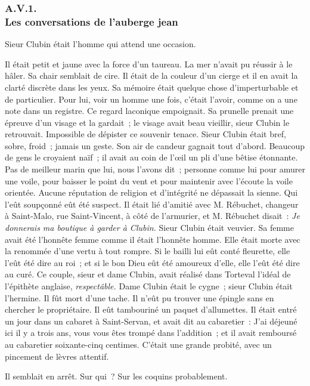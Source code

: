 \documentclass[french,twoside]{book} %
\begin{document}
  \subsubsection[{A.V.1. Les conversations de l’auberge jean}]{A.V.1. \\
Les conversations de l’auberge jean}
\noindent Sieur Clubin était l’homme qui attend une occasion.\par
Il était petit et jaune avec la force d’un taureau. La mer n’avait pu réussir à le hâler. Sa chair semblait de cire. Il était de la couleur d’un cierge et il en avait la clarté discrète dans les yeux. Sa mémoire était quelque chose d’imperturbable et de particulier. Pour lui, voir un homme une fois, c’était l’avoir, comme on a une note dans un registre. Ce regard laconique empoignait. Sa prunelle prenait une épreuve d’un visage et la gardait ; le visage avait beau vieillir, sieur Clubin le retrouvait. Impossible de dépister ce souvenir tenace. Sieur Clubin était bref, sobre, froid ; jamais un geste. Son air de candeur gagnait tout d’abord. Beaucoup de gens le croyaient naïf ; il avait au coin de l’œil un pli d’une bêtise étonnante. Pas de meilleur marin que lui, nous l’avons dit ; personne comme lui  pour amurer une voile, pour baisser le point du vent et pour maintenir avec l’écoute la voile orientée. Aucune réputation de religion et d’intégrité ne dépassait la sienne. Qui l’eût soupçonné eût été suspect. Il était lié d’amitié avec M. Rébuchet, changeur à Saint-Malo, rue Saint-Vincent, à côté de l’armurier, et M. Rébuchet disait : \emph{Je donnerais ma boutique à garder à Clubin.} Sieur Clubin était veuvier. Sa femme avait été l’honnête femme comme il était l’honnête homme. Elle était morte avec la renommée d’une vertu à tout rompre. Si le bailli lui eût conté fleurette, elle l’eût été dire au roi ; et si le bon Dieu eût été amoureux d’elle, elle l’eût été dire au curé. Ce couple, sieur et dame Clubin, avait réalisé dans Torteval l’idéal de l’épithète anglaise, \emph{respectâble.} Dame Clubin était le cygne ; sieur Clubin était l’hermine. Il fût mort d’une tache. Il n’eût pu trouver une épingle sans en chercher le propriétaire. Il eût tambouriné un paquet d’allumettes. Il était entré un jour dans un cabaret à Saint-Servan, et avait dit au cabaretier : J’ai déjeuné ici il y a trois ans, vous vous êtes trompé dans l’addition ; et il avait remboursé au cabaretier soixante-cinq centimes. C’était une grande probité, avec un pincement de lèvres attentif.\par
Il semblait en arrêt. Sur qui ? Sur les coquins probablement.\par
\end{document}
